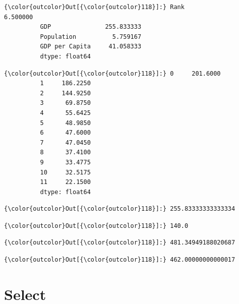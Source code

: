 \documentclass[11pt]{article}
\begin{document}
\begin{Verbatim}[commandchars=\\\{\}]
{\color{outcolor}Out[{\color{outcolor}118}]:} Rank                6.500000
          GDP               255.833333
          Population          5.759167
          GDP per Capita     41.058333
          dtype: float64
\end{Verbatim}
            
\begin{Verbatim}[commandchars=\\\{\}]
{\color{outcolor}Out[{\color{outcolor}118}]:} 0     201.6000
          1     186.2250
          2     144.9250
          3      69.8750
          4      55.6425
          5      48.9850
          6      47.6000
          7      47.0450
          8      37.4100
          9      33.4775
          10     32.5175
          11     22.1500
          dtype: float64
\end{Verbatim}
            
\begin{Verbatim}[commandchars=\\\{\}]
{\color{outcolor}Out[{\color{outcolor}118}]:} 255.83333333333334
\end{Verbatim}
            
\begin{Verbatim}[commandchars=\\\{\}]
{\color{outcolor}Out[{\color{outcolor}118}]:} 140.0
\end{Verbatim}
            
\begin{Verbatim}[commandchars=\\\{\}]
{\color{outcolor}Out[{\color{outcolor}118}]:} 481.34949188020687
\end{Verbatim}
            
\begin{Verbatim}[commandchars=\\\{\}]
{\color{outcolor}Out[{\color{outcolor}118}]:} 462.00000000000017
\end{Verbatim}
            
    \section{Select}\label{select}
\end{document}
